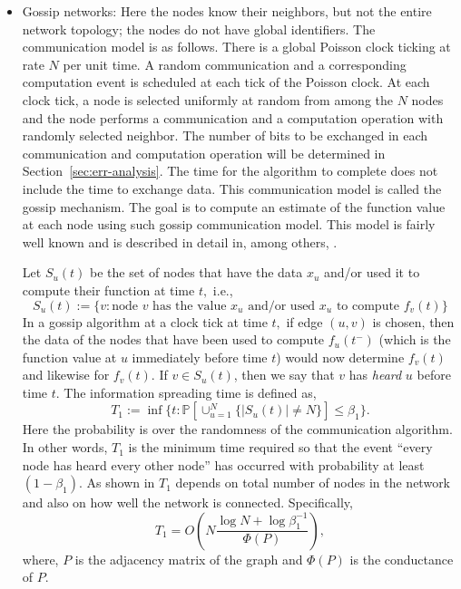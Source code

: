 \documentclass[10pt,twosided,a4paper,draft,onecolumn]{article}
\newcommand{\prob}[1]{\mathbb{P}\left[ #1 \right]}
\begin{document}
\begin{itemize}
\item Gossip networks: Here the nodes know their neighbors, but not
  the entire network topology; the nodes do not have global
  identifiers. The communication model is as follows. There is a
  global Poisson clock ticking at rate $N$ per unit time. A random
  communication and a corresponding computation event is scheduled at
  each tick of the Poisson clock. At each clock tick, a node is
  selected uniformly at random from among the $N$ nodes and the node
  performs a communication and a computation operation with randomly
  selected neighbor. The number of bits to be exchanged in each communication and computation operation 
  will be determined in Section~\ref{sec:err-analysis}. 
  The time for the algorithm to complete does not include the time to exchange data.   
  This communication model is called the gossip mechanism. The goal is to compute an 
  estimate of the function value at each node using such gossip
  communication model. This model is fairly well known and is
  described in detail in, among others, \cite{Shah09,Boyd05}.

  Let $S_u(t)$ be the set of nodes that have the data $x_u$ and/or used it to compute 
  their function at time $t,$ i.e.,
\begin{displaymath}
   S_u(t) := \{v: \mbox{node $v$ has the value $x_u$ and/or used $x_u$ to compute $f_v(t)$}\}
  \end{displaymath}
In a gossip algorithm at a clock tick at time $t,$ if edge $(u,v)$ is chosen, then the
  data of the nodes that have been used to compute $f_u(t^{-})$ 
  (which is the function value at $u$ immediately before time $t$) would now
  determine $f_v(t)$ and likewise for $f_v(t).$
  If $v \in S_u(t)$, then we say that $v$ has \emph{heard} $u$ before
  time $t.$ The information spreading time is defined as,
\begin{displaymath}
    T_1 := \inf \{t: \prob{ \cup_{u=1}^N \{ |S_u(t)| \neq N \}} \leq
    \beta_1 \}. 
  \end{displaymath}
Here the probability is over the randomness of the communication
  algorithm. In other words, $T_1$ is the minimum time required so
  that the event ``every node has heard every other node'' has
  occurred with probability at least $(1-\beta_1).$ As shown in
  \cite{Mosk-Aoyama06} $T_1$ depends on total number of nodes in the
  network and also on how well the network is connected. Specifically, 
\begin{displaymath}
    T_1 = O \left(N\frac{\log N + \log \beta_1^{-1}}{\Phi(P)} \right),
  \end{displaymath}
where, $P$ is the adjacency matrix of the graph and $\Phi(P)$ is the
  conductance of $P.$


\end{itemize}
\end{document}
